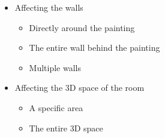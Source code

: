 \documentclass[a4paper]{article}
\begin{document}

\begin{itemize}
\item Affecting the walls
\begin{itemize}
\item Directly around the painting
\item The entire wall behind the painting
\item Multiple walls
\end{itemize}
\item Affecting the 3D space of the room
\begin{itemize}
\item A specific area
\item The entire 3D space
\end{itemize}
\end{itemize}

\end{document}
